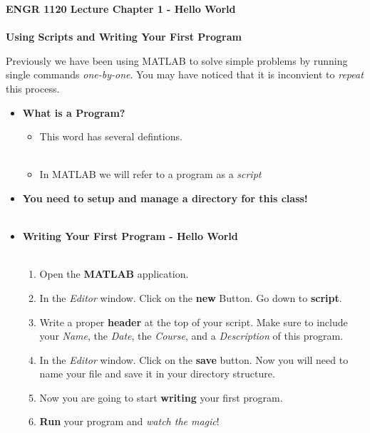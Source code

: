 \documentclass[11pt]{article}
\newcommand{\NUM}{1 }
\begin{document}
\textbf{ \LARGE ENGR 1120 Lecture Chapter \NUM - Hello World \\\\	  Using Scripts and Writing Your First Program} \\
\Large

Previously we have been using MATLAB to solve simple problems by running single commands {\it one-by-one}. You may have noticed that it is inconvient to {\it repeat} this process. \\

\begin{itemize}

	\item \textbf{ \LARGE What is a Program?}\\
		\begin{itemize}
			\item This word has several defintions. \\\\

			\item  In MATLAB we will refer to a program as a {\it script}	
		\end{itemize}

\newpage
	\Large
	\item \textbf{ \LARGE You need to setup and manage a directory for this class!}\\\


\newpage
	\Large
	\item \textbf{ \LARGE Writing Your First Program - Hello World}\\\
		\Large
		\begin{enumerate}
			\item Open the {\bf MATLAB} application.
			
			\newpage
			\item In the {\it Editor} window. Click on the {\bf new } Button. Go down to {\bf script}.	
			
			\newpage
			\item Write a proper {\bf header} at the top of your script. Make sure to include your {\it Name}, the {\it Date}, the {\it Course}, and a {\it Description} of this program.
			
			\newpage
			\item In the {\it Editor} window. Click on the {\bf save} button. Now you will need to name your file and save it in your directory structure.
			
			\newpage
			\item Now you are going to start {\bf writing} your first program. 
			
			\newpage
			\item {\bf Run} your program and {\it watch the magic}!
		\end{enumerate}

\end{itemize}


	
\end{document}
